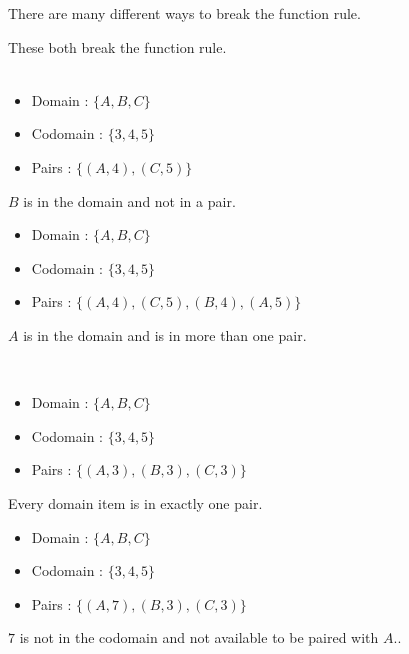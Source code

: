\documentclass{ximera}
\begin{document}
There are many different ways to break the function rule.

\begin{example}
These both break the function rule. \\
\quad \\
\begin{itemize}
\item Domain : $\{ A, B, C \}$
\item Codomain : $\{ 3, 4, 5 \}$
\item Pairs : $\{ (A, 4), (C, 5) \}$
\end{itemize}
$B$ is in the domain and not in a pair.

\begin{itemize}
\item Domain : $\{ A, B, C \}$
\item Codomain : $\{ 3, 4, 5 \}$
\item Pairs : $\{ (A, 4), (C, 5) , (B, 4), (A, 5) \}$
\end{itemize}
$A$ is in the domain and is in more than one pair.
\end{example}
\quad \\


\begin{question}
\begin{itemize}
\item Domain : $\{ A, B, C \}$
\item Codomain : $\{ 3, 4, 5 \}$
\item Pairs : $\{ (A, 3), (B, 3), (C, 3) \}$
\end{itemize}

\begin{multipleChoice}
\end{multipleChoice}
\begin{feedback}
Every domain item is in exactly one pair. 
\end{feedback}
\end{question}



\begin{question}
\begin{itemize}
\item Domain : $\{ A, B, C \}$
\item Codomain : $\{ 3, 4, 5 \}$
\item Pairs : $\{ (A, 7), (B, 3), (C, 3) \}$
\end{itemize}

\begin{multipleChoice}
\end{multipleChoice}
\begin{feedback}
$7$ is not in the codomain and not available to be paired with $A$.. 
\end{feedback}
\end{question}
\end{document}
